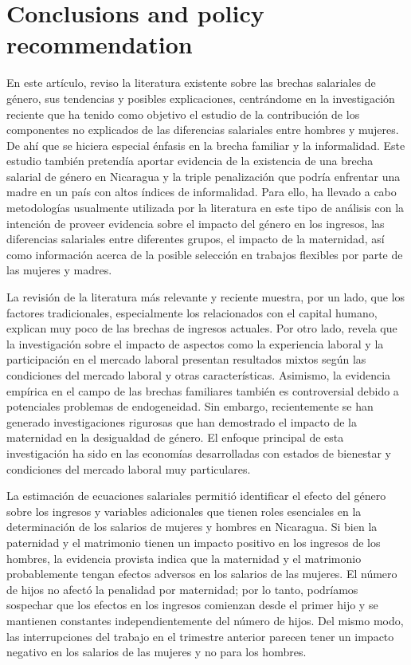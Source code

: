 \section{Conclusions and policy recommendation}
En este artículo, reviso la literatura existente sobre las brechas salariales de género, sus tendencias y posibles explicaciones, centrándome en la investigación reciente que ha tenido como objetivo el estudio de la contribución de los componentes no explicados de las diferencias salariales entre hombres y mujeres. De ahí que se hiciera especial énfasis en la brecha familiar y la informalidad. Este estudio también pretendía aportar evidencia de la existencia de una brecha salarial de género en Nicaragua y la triple penalización que podría enfrentar una madre en un país con altos índices de informalidad. Para ello, ha llevado a cabo metodologías usualmente utilizada por la literatura en este tipo de análisis con la intención de proveer evidencia sobre el impacto del género en los ingresos, las diferencias salariales entre diferentes grupos, el impacto de la maternidad, así como información acerca de la posible selección en trabajos flexibles por parte de las mujeres y madres.

La revisión de la literatura más relevante y reciente muestra, por un lado, que los factores tradicionales, especialmente los relacionados con el capital humano, explican muy poco de las brechas de ingresos actuales. Por otro lado, revela que la investigación sobre el impacto de aspectos como la experiencia laboral y la participación en el mercado laboral presentan resultados mixtos según las condiciones del mercado laboral y otras características. Asimismo, la evidencia empírica en el campo de las brechas familiares también es controversial debido a potenciales problemas de endogeneidad. Sin embargo, recientemente se han generado investigaciones rigurosas que han demostrado el impacto de la maternidad en la desigualdad de género. El enfoque principal de esta investigación ha sido en las economías desarrolladas con estados de bienestar y condiciones del mercado laboral muy particulares.

La estimación de ecuaciones salariales permitió identificar el efecto del género sobre los ingresos y variables adicionales que tienen roles esenciales en la determinación de los salarios de mujeres y hombres en Nicaragua. Si bien la paternidad y el matrimonio tienen un impacto positivo en los ingresos de los hombres, la evidencia provista indica que la maternidad y el matrimonio probablemente tengan efectos adversos en los salarios de las mujeres. El número de hijos no afectó la penalidad por maternidad; por lo tanto, podríamos sospechar que los efectos en los ingresos comienzan desde el primer hijo y se mantienen constantes independientemente del número de hijos. Del mismo modo, las interrupciones del trabajo en el trimestre anterior parecen tener un impacto negativo en los salarios de las mujeres y no para los hombres.

